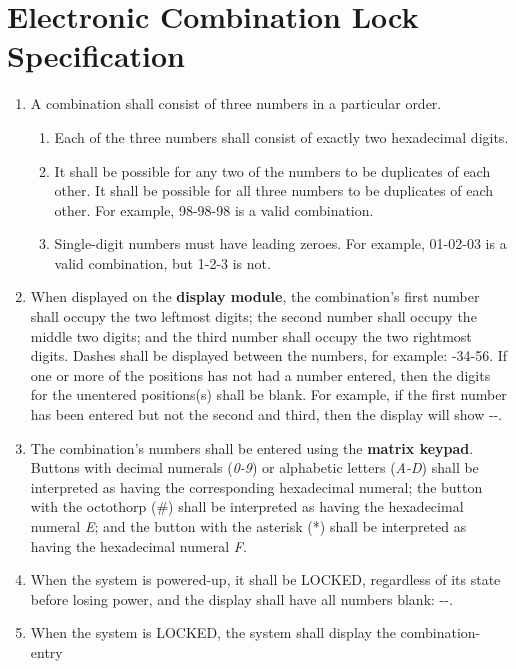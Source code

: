 \section{Electronic Combination Lock Specification} \label{sec:FunctionalSpecification}

\begin{enumerate}
\item A combination shall consist of three numbers in a particular order.
    \begin{enumerate}
    \item Each of the three numbers shall consist of exactly two hexadecimal
        digits.
    \item It shall be possible for any two of the numbers to be duplicates of
        each other. It shall be possible for all three numbers to be duplicates
        of each other. For example, 98-98-98 is a valid combination.
    \item Single-digit numbers must have leading zeroes. For example,
        01-02-03 is a valid combination, but 1-2-3 is not.
    \end{enumerate}
\item When displayed on the \textbf{display module}, the combination's first
    number shall occupy the two leftmost digits; the second number shall occupy
    the middle two digits; and the third number shall occupy the two rightmost
    digits. Dashes shall be displayed between the numbers, for example:
    {-34-56}. If one or more of the positions has not had a number
    entered, then the digits for the unentered positions(s) shall be blank.
    For example, if the first number has been entered but not the second and
    third, then the display will show {-\phantom{88}-\phantom{88}}.
\item The combination's numbers shall be entered using the \textbf{matrix
    keypad}. Buttons with decimal numerals (\textit{0-9}) or alphabetic letters
    (\textit{A-D}) shall be interpreted as having the corresponding hexadecimal
    numeral; the button with the octothorp (\#) shall be interpreted as having
    the hexadecimal numeral \textit{E}; and the button with the asterisk (*)
    shall be interpreted as having the hexadecimal numeral \textit{F}.
\item When the system is powered-up, it shall be LOCKED, regardless of its state
    before losing power, and the display shall have all numbers blank:
    {\dviiseg \phantom{88}-\phantom{88}-\phantom{88}}.
\item When the system is LOCKED, the system shall display the combination-entry

\end{enumerate}
